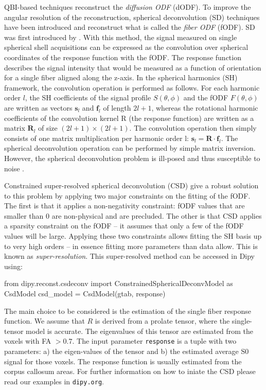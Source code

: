 \documentclass{bioinfo}
\begin{document}
QBI-based techniques reconstruct the \emph{diffusion
  ODF} (dODF). To improve the angular resolution of the reconstruction, spherical
deconvolution (SD) techniques have been introduced and reconstruct what is
called the \emph{fiber ODF} (fODF).
SD was first introduced by \citet{tournier-calamante-etal:04}. With
this method, the signal measured on single spherical shell
acquisitions can be expressed as the convolution over spherical coordinates of
the response function with the fODF. The response
function describes the signal intensity that would be measured as a function of
orientation for a single fiber aligned along the z-axis. In the spherical
harmonics (SH) framework, the convolution operation is performed as
follows. For each harmonic order $l$, the SH coefficients of the signal profile
$S(\theta, \phi)$ and the fODF $F(\theta, \phi)$ are written as vectors
$\mathbf{s}_l$ and $\mathbf{f}_l$ of length $2l+1$, whereas the rotational
harmonic coefficients of the convolution kernel R (the response function) are
written as a matrix $\mathbf{R}_l$ of size $(2l+ 1)\times(2l+ 1)$. The
convolution operation then simply consists of one matrix multiplication per
harmonic order l: $\mathbf{s}_l=\mathbf{R}\cdot\mathbf{f}_l$. The spherical
deconvolution operation can be performed by simple matrix inversion. However,
the spherical deconvolution problem is ill-posed and thus susceptible
to noise \citep{tournier-calamante-etal:04}.

Constrained super-resolved spherical deconvolution (CSD)
\citet{tournier-calamante-etal:07} give a robust solution to this problem by
applying two major constraints on the fitting of the fODF. The first is that it
applies a non-negativity constraint: fODF values that are smaller than 0 are
non-physical and are precluded. The other is that CSD applies a sparsity
constraint on the fODF -- it assumes that only a few of the fODF values will be
large. Applying these two constraints allows fitting the SH basis
up to very high orders -- in essence fitting more parameters than data allow.
This is known as \emph{super-resolution}. This super-resolved method
can be accessed in Dipy using:
\begin{python}
from dipy.reconst.csdeconv import
        ConstrainedSphericalDeconvModel as CsdModel
csd_model = CsdModel(gtab, response)
\end{python}
The main choice to be considered is the estimation of the single fiber response
function.  We assume that $R$ is derived from a prolate tensor, where
the single-tensor model is accurate. The eigenvalues
of this tensor are estimated from the voxels with FA $> 0.7$. The input
parameter \texttt{response} is a tuple with two parameters: a) the eigen-values
of the tensor and b) the estimated average S0 signal for those voxels. The
response function is usually estimated from the corpus callosum areas. For
further information on how to iniate the CSD please read our examples in
\texttt{dipy.org}.
\end{document}
